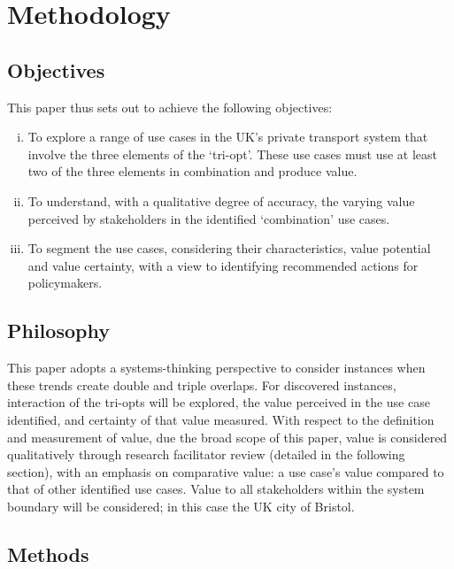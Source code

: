 \documentclass[b5paper,10pt]{article}
\begin{document}
\section{Methodology}\label{methodology}

\subsection{Objectives}

This paper thus sets out to achieve the following objectives:

\begin{enumerate}[i)]
\item To explore a range of use cases in the UK's private transport
system that involve the three elements of the `tri-opt'. These use
cases must use at least two of the three elements in combination and
produce value.
\item To understand, with a qualitative degree of accuracy, the varying
value perceived by stakeholders in the identified `combination' use
cases.
\item To segment the use cases, considering their characteristics,
value potential and value certainty, with a view to identifying
recommended actions for policymakers.
\end{enumerate}

\subsection{Philosophy}

This paper adopts a systems-thinking perspective to consider instances
when these trends create double and triple overlaps. For discovered
instances, interaction of the tri-opts will be explored, the value
perceived in the use case identified, and certainty of that value
measured. With respect to the definition and measurement of value, due
the broad scope of this paper, value is considered qualitatively
through research facilitator review (detailed in the following
section), with an emphasis on comparative value: a use case's value
compared to that of other identified use cases. Value to all
stakeholders within the system boundary will be considered; in this
case the UK city of Bristol.

\subsection{Methods}
\end{document}
